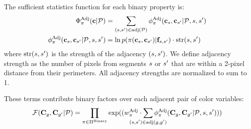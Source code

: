 The sufficient statistics function for each binary property is:
 \begin{align*}
 \Phi^{\textrm{Adj}}_\pi(\mathbf{c} | \mathcal{P}) &= \sum_{(s, {s^{\prime}}) \in \text{adj}(\mathcal{P})} \phi^{\textrm{Adj}}_\pi(\mathbf{c}_s, \mathbf{c}_{s^{\prime}} | \mathcal{P}, s, {s^{\prime}}) \\
 \phi^{\textrm{Adj}}_\pi(\mathbf{c}_s, \mathbf{c}_{s^{\prime}} | \mathcal{P}, s, {s^{\prime}}) &= \ln p( \pi( \mathbf{c}_s, \mathbf{c}_{s^{\prime}} ) | \mathbf{f}_{s, {s^{\prime}}} ) \cdot \text{str}(s, {s^{\prime}})
\end{align*}
where $\text{str}(s,{s^{\prime}})$ is the strength of the adjacency $(s,{s^{\prime}})$. We define adjacency strength as the number of pixels from segments $s$ or ${s^{\prime}}$ that are within a 2-pixel distance from their perimeters. All adjacency strengths are normalized to sum to 1.  

These terms contribute binary factors over each adjacent pair of color variables:
\begin{equation*}
 \factor(\colorVars_\group, \colorVars_\groupprime | \pattern) = \prod_{\prop \in \binaryProps} \exp( (\adjTermWeight \cdot \sum_{\mathclap{(\segment, \segprime) \in \adj(\group, \groupprime)}} \adjInstStats( \colorVars_\group, \colorVars_\groupprime | \pattern, \segment, \segprime))) 
\end{equation*}